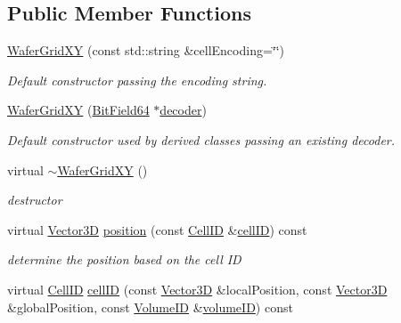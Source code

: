 \subsection*{Public Member Functions}
\begin{DoxyCompactItemize}
\item 
\hyperlink{class_d_d4hep_1_1_d_d_segmentation_1_1_wafer_grid_x_y_af8bf027d4db4e41a774451c0479e0e58}{Wafer\+Grid\+XY} (const std\+::string \&cell\+Encoding=\char`\"{}\char`\"{})
\begin{DoxyCompactList}\small\item\em Default constructor passing the encoding string. \end{DoxyCompactList}\item 
\hyperlink{class_d_d4hep_1_1_d_d_segmentation_1_1_wafer_grid_x_y_ad592caf7fc7f3b68248e3e81e653c773}{Wafer\+Grid\+XY} (\hyperlink{class_d_d4hep_1_1_d_d_segmentation_1_1_bit_field64}{Bit\+Field64} $\ast$\hyperlink{class_d_d4hep_1_1_d_d_segmentation_1_1_segmentation_abec3489982d0fe91ef4b142d9d755576}{decoder})
\begin{DoxyCompactList}\small\item\em Default constructor used by derived classes passing an existing decoder. \end{DoxyCompactList}\item 
virtual \hyperlink{class_d_d4hep_1_1_d_d_segmentation_1_1_wafer_grid_x_y_a07377755b469f13a9fea18473a39959e}{$\sim$\+Wafer\+Grid\+XY} ()
\begin{DoxyCompactList}\small\item\em destructor \end{DoxyCompactList}\item 
virtual \hyperlink{struct_d_d4hep_1_1_d_d_segmentation_1_1_vector3_d}{Vector3D} \hyperlink{class_d_d4hep_1_1_d_d_segmentation_1_1_wafer_grid_x_y_a1682e14c303ca45e402a1aa648f58558}{position} (const \hyperlink{namespace_d_d4hep_1_1_d_d_segmentation_ac7af071d85cb48820914434a07e21ba1}{Cell\+ID} \&\hyperlink{class_d_d4hep_1_1_d_d_segmentation_1_1_wafer_grid_x_y_a5218281846eb9567e526cbaaeab85440}{cell\+ID}) const
\begin{DoxyCompactList}\small\item\em determine the position based on the cell ID \end{DoxyCompactList}\item 
virtual \hyperlink{namespace_d_d4hep_1_1_d_d_segmentation_ac7af071d85cb48820914434a07e21ba1}{Cell\+ID} \hyperlink{class_d_d4hep_1_1_d_d_segmentation_1_1_wafer_grid_x_y_a5218281846eb9567e526cbaaeab85440}{cell\+ID} (const \hyperlink{struct_d_d4hep_1_1_d_d_segmentation_1_1_vector3_d}{Vector3D} \&local\+Position, const \hyperlink{struct_d_d4hep_1_1_d_d_segmentation_1_1_vector3_d}{Vector3D} \&global\+Position, const \hyperlink{namespace_d_d4hep_1_1_d_d_segmentation_a61a6833a18d1800bdef176595f83e3ba}{Volume\+ID} \&\hyperlink{class_d_d4hep_1_1_d_d_segmentation_1_1_segmentation_a43c0e9648e3b7cded015847c0802f757}{volume\+ID}) const

\end{DoxyCompactItemize}
